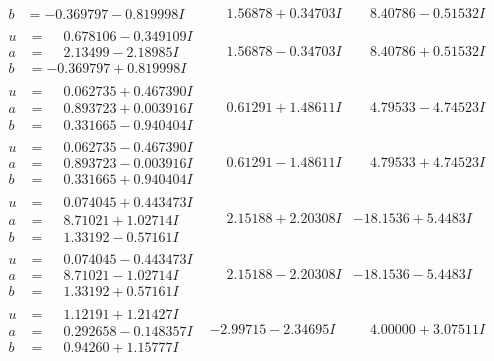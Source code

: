 \documentclass[1p]{elsarticle_modified}
\theoremstyle{definition}
\begin{document}
$$\begin{array}{c|c|c}
\begin{aligned}
b &= -0.369797 - 0.819998 I\end{aligned}
 & \phantom{-}1.56878 + 0.34703 I & \phantom{-}8.40786 - 0.51532 I \\ \hline\begin{aligned}
u &= \phantom{-}0.678106 - 0.349109 I \\
a &= \phantom{-}2.13499 - 2.18985 I \\
b &= -0.369797 + 0.819998 I\end{aligned}
 & \phantom{-}1.56878 - 0.34703 I & \phantom{-}8.40786 + 0.51532 I \\ \hline\begin{aligned}
u &= \phantom{-}0.062735 + 0.467390 I \\
a &= \phantom{-}0.893723 + 0.003916 I \\
b &= \phantom{-}0.331665 - 0.940404 I\end{aligned}
 & \phantom{-}0.61291 + 1.48611 I & \phantom{-}4.79533 - 4.74523 I \\ \hline\begin{aligned}
u &= \phantom{-}0.062735 - 0.467390 I \\
a &= \phantom{-}0.893723 - 0.003916 I \\
b &= \phantom{-}0.331665 + 0.940404 I\end{aligned}
 & \phantom{-}0.61291 - 1.48611 I & \phantom{-}4.79533 + 4.74523 I \\ \hline\begin{aligned}
u &= \phantom{-}0.074045 + 0.443473 I \\
a &= \phantom{-}8.71021 + 1.02714 I \\
b &= \phantom{-}1.33192 - 0.57161 I\end{aligned}
 & \phantom{-}2.15188 + 2.20308 I & -18.1536 + 5.4483 I \\ \hline\begin{aligned}
u &= \phantom{-}0.074045 - 0.443473 I \\
a &= \phantom{-}8.71021 - 1.02714 I \\
b &= \phantom{-}1.33192 + 0.57161 I\end{aligned}
 & \phantom{-}2.15188 - 2.20308 I & -18.1536 - 5.4483 I \\ \hline\begin{aligned}
u &= \phantom{-}1.12191 + 1.21427 I \\
a &= \phantom{-}0.292658 - 0.148357 I \\
b &= \phantom{-}0.94260 + 1.15777 I\end{aligned}
 & -2.99715 - 2.34695 I & \phantom{-}4.00000 + 3.07511 I \\ \hline\begin{aligned}

\end{aligned}
\end{array}$$
\end{document}
